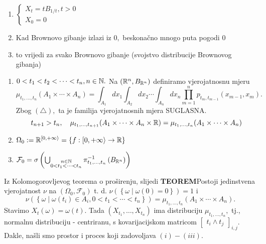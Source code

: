 \documentclass{article}
\begin{document}
\begin{enumerate}
    \item [] \(\begin{cases}X_t=tB_{1/t},t>0\\X_0=0\end{cases}\)
    \item[\ding{228}] Kad Brownovo gibanje izlazi iz \(0,\) beskonačno mnogo puta pogodi \(0\)
    \item[\ding{228}] to vrijedi za svako Brownovo gibanje (svojstvo distribucije Brownovog gibanja)
\end{enumerate}
\begin{enumerate}
    \item[\ding{113}] \(0<t_1<t_2<\cdots<t_n,n\in\Bbb N.\) Na \(\left(\Bbb R^n,B_{\Bbb R^n}\right)\) definiramo vjerojatnosnu mjeru \[\mu_{t_1,\ldots,t_n}(A_1\times\cdots\times A_n)=\int_{A_1}dx_1\int_{A_2}dx_2\cdots\int_{A_n}dx_n\prod_{m=1}^np_{t_m,t_{m-1}}(x_{m-1},x_m).\] Zbog \((\triangle),\) ta je familija vjerojatnosnih mjera SUGLASNA. \[t_{n+1}>t_n,\quad\mu_{t_1,\ldots,t_{n+1}}(A_1\times\cdots\times A_n\times\Bbb R)=\mu_{t_1,\ldots,t_n}(A_1\times\cdots\times A_n)\] 
    \item[\ding{228}] \(\Omega_0:=\Bbb R^{[0,+\infty\rangle}=\left\{f:[0,+\infty\rangle\to\Bbb R\right\}\)
    \item[\ding{228}]  \(\mathcal F_0=\sigma\left(\bigcup_{\substack{n\in\Bbb N\\0<t_1<\cdots<t_n}}\pi^{-1}_{t_1,\ldots,t_n}\left(B_{\Bbb R^n}\right)\right)\)
\end{enumerate}
Iz Kolomogorovljevog teorema o proširenju, slijedi\newline\newline
\textbf{TEOREM}\newline Postoji jedinstvena vjerojatnost \(\nu\) na \((\Omega_0,\mathcal F_0)\) t. d. \(\nu\left(\left\{\omega\mid \omega(0)=0\right\}\right)=1\) i \[\nu\left(\left\{\omega\mid\omega(t_i)\in A_i,0<t_1<\cdots<t_n\right\}\right)=\mu_{t_1,\ldots,t_n}(A_1\times\cdots\times A_n).\] Stavimo \(X_t(\omega)=\omega(t).\) Tada \((X_{t_1},\ldots,X_{t_n})\) ima distribuciju \(\mu_{t_1,\ldots,t_n},\) tj., normalnu distribuciju - centriranu, s kovarijacijskom matricom \(\begin{bmatrix}t_i\land t_j\end{bmatrix}_{i,j}.\)\newline\newline Dakle, našli smo prostor i proces koji zadovoljava \((i)-(iii).\)\newline\newline
\end{document}
